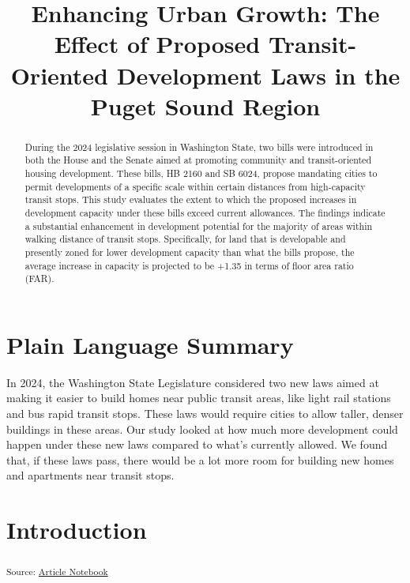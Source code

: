 \documentclass[
]{agujournal2019}
\begin{document}
\title{Enhancing Urban Growth: The Effect of Proposed Transit-Oriented
Development Laws in the Puget Sound Region}



\begin{abstract}
During the 2024 legislative session in Washington State, two bills were
introduced in both the House and the Senate aimed at promoting community
and transit-oriented housing development. These bills, HB 2160 and SB
6024, propose mandating cities to permit developments of a specific
scale within certain distances from high-capacity transit stops. This
study evaluates the extent to which the proposed increases in
development capacity under these bills exceed current allowances. The
findings indicate a substantial enhancement in development potential for
the majority of areas within walking distance of transit stops.
Specifically, for land that is developable and presently zoned for lower
development capacity than what the bills propose, the average increase
in capacity is projected to be +1.35 in terms of floor area ratio (FAR).
\end{abstract}

\section*{Plain Language Summary}
In 2024, the Washington State Legislature considered two new laws aimed
at making it easier to build homes near public transit areas, like light
rail stations and bus rapid transit stops. These laws would require
cities to allow taller, denser buildings in these areas. Our study
looked at how much more development could happen under these new laws
compared to what's currently allowed. We found that, if these laws pass,
there would be a lot more room for building new homes and apartments
near transit stops.



\section{Introduction}\label{introduction}

\textsubscript{Source:
\href{https://tiernanmartin.github.io/2024-transit-oriented-development-bill/index-preview.html}{Article
Notebook}}
\end{document}
